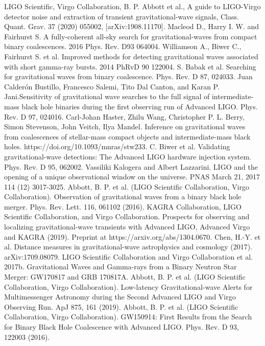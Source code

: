 \documentclass[binding=0.6cm, LaM]{sapthesis}
\begin{document}
\begin{thebibliography}{500}
	 LIGO Scientific, Virgo Collaboration, B. P. Abbott et al., A guide to LIGO-Virgo detector noise and extraction of transient gravitational-wave signals, Class. Quant. Grav. 37 (2020) 055002, [arXiv:1908.11170]. 
	 Macleod D., Harry I. W. and Fairhurst S. A fully-coherent all-sky search for gravitational-waves from compact binary coalescences. 2016 Phys. Rev. D93 064004. 
	 Williamson A., Biwer C., Fairhurst S. et al. Improved methods for detecting gravitational waves associated with short gamma-ray bursts. 2014 PhRvD 90 122004.
	 S. Babak et al. Searching for gravitational waves from binary coalescence. Phys. Rev. D 87, 024033.
	 Juan Calderón Bustillo, Francesco Salemi, Tito Dal Canton, and Karan P. Jani.Sensitivity of gravitational wave searches to the full signal of intermediate-mass black hole binaries during the first observing run of Advanced LIGO. Phys. Rev. D 97, 024016.
	 Carl-Johan Haster, Zhilu Wang, Christopher P. L. Berry, Simon Stevenson, John Veitch, Ilya Mandel. Inference on gravitational waves from coalescences of stellar-mass compact objects and intermediate-mass black holes. https://doi.org/10.1093/mnras/stw233.
	 C. Biwer et al. Validating gravitational-wave detections: The Advanced LIGO hardware injection system. Phys. Rev. D 95, 062002.
	 Vassiliki Kalogera and Albert Lazzarini. LIGO and the opening of a unique observational window on the universe. PNAS March 21, 2017 114 (12) 3017-3025.
	 Abbott, B. P. et al. (LIGO Scientific Collaboration, Virgo Collaboration). Observation of gravitational waves from a binary black hole merger. Phys. Rev. Lett. 116, 061102 (2016).
	 KAGRA Collaboration, LIGO Scientific Collaboration, and Virgo Collaboration. Prospects for observing and localizing gravitational-wave transients with Advanced LIGO, Advanced Virgo and KAGRA (2019). Preprint at https://arxiv.org/abs/1304.0670. 
          Chen, H.-Y. et al. Distance measures in gravitational-wave astrophysics and cosmology (2017). arXiv:1709.08079.
	 LIGO Scientific Collaboration and Virgo Collaboration et al. 2017b. Gravitational Waves and Gamma-rays from a Binary Neutron Star Merger: GW170817 and GRB 170817A.
	 Abbott, B. P. et al. (LIGO Scientific Collaboration, Virgo Collaboration). Low-latency Gravitational-wave Alerts for Multimessenger Astronomy during the Second Advanced LIGO and Virgo Observing Run. ApJ 875, 161 (2019). 
	 Abbott, B. P. et al. (LIGO Scientific Collaboration, Virgo Collaboration). GW150914: First Results from the Search for Binary Black Hole Coalescence with Advanced LIGO. Phys. Rev. D 93, 122003 (2016). 

\end{thebibliography}
\end{document}
